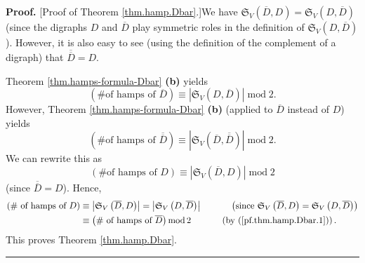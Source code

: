 \documentclass[numbers=enddot,12pt,final,onecolumn,notitlepage]{scrartcl}%
\numberwithin{exer}{section}
\theoremstyle{definition}
\newenvironment{proof}[1][Proof]{\noindent\textbf{#1.} }{\ \rule{0.5em}{0.5em}}
\begin{document}
\begin{proof}
[Proof of Theorem \ref{thm.hamp.Dbar}.]We have $\mathfrak{S}_{V}\left(
\overline{D},D\right)  =\mathfrak{S}_{V}\left(  D,\overline{D}\right)  $
(since the digraphs $D$ and $\overline{D}$ play symmetric roles in the
definition of $\mathfrak{S}_{V}\left(  D,\overline{D}\right)  $). However, it
is also easy to see (using the definition of the complement of a digraph) that
$\overline{\overline{D}}=D$.

Theorem \ref{thm.hamps-formula-Dbar} \textbf{(b)} yields
\begin{equation}
\left(  \text{\# of hamps of }\overline{D}\right)  \equiv\left\vert
\mathfrak{S}_{V}\left(  D,\overline{D}\right)  \right\vert \operatorname{mod}%
2. \label{pf.thm.hamp.Dbar.1}%
\end{equation}
However, Theorem \ref{thm.hamps-formula-Dbar} \textbf{(b)} (applied to
$\overline{D}$ instead of $D$) yields%
\[
\left(  \text{\# of hamps of }\overline{\overline{D}}\right)  \equiv\left\vert
\mathfrak{S}_{V}\left(  \overline{D},\overline{\overline{D}}\right)
\right\vert \operatorname{mod}2.
\]
We can rewrite this as%
\[
\left(  \text{\# of hamps of }D\right)  \equiv\left\vert \mathfrak{S}%
_{V}\left(  \overline{D},D\right)  \right\vert \operatorname{mod}2
\]
(since $\overline{\overline{D}}=D$). Hence,%
\begin{align*}
\left(  \text{\# of hamps of }D\right)   &  \equiv\left\vert \mathfrak{S}%
_{V}\left(  \overline{D},D\right)  \right\vert =\left\vert \mathfrak{S}%
_{V}\left(  D,\overline{D}\right)  \right\vert \ \ \ \ \ \ \ \ \ \ \left(
\text{since }\mathfrak{S}_{V}\left(  \overline{D},D\right)  =\mathfrak{S}%
_{V}\left(  D,\overline{D}\right)  \right) \\
&  \equiv\left(  \text{\# of hamps of }\overline{D}\right)  \operatorname{mod}%
2\ \ \ \ \ \ \ \ \ \ \left(  \text{by (\ref{pf.thm.hamp.Dbar.1})}\right)  .
\end{align*}
This proves Theorem \ref{thm.hamp.Dbar}.
\end{proof}
\end{document}
